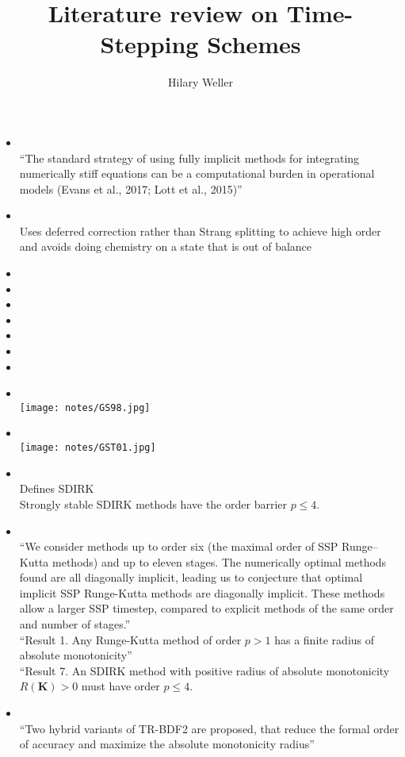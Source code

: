 \documentclass[12pt]{article}
\begin{document}
\title{Literature review on Time-Stepping Schemes}
\author{Hilary Weller}
\maketitle

\begin{itemize}
\item {} \ \\
``The standard strategy of using fully implicit methods for integrating numerically stiff equations can be a computational burden in operational models (Evans et al., 2017; Lott et al., 2015)''
\item {} \ \\
Uses deferred correction rather than Strang splitting to achieve high order and avoids doing chemistry on a state that is out of balance
\item {}
\item {}
\item {}
\item {}
\item {}
\item {}
\item {}
\item {} \ \\ \texttt{[image: notes/GS98.jpg]}
\item {} \ \\ \texttt{[image: notes/GST01.jpg]}
\item {} \ \\ Defines SDIRK \\
Strongly stable SDIRK methods have the order barrier $p\le 4$.
\item {} \ \\
``We consider methods up to order six (the maximal order of SSP Runge–Kutta methods) and up to eleven stages. The
numerically optimal methods found are all diagonally implicit, leading us to conjecture that optimal implicit SSP Runge-Kutta
methods are diagonally implicit. These methods allow a larger SSP timestep, compared to explicit methods of the same order and
number of stages.'' \\
``Result 1. Any Runge-Kutta method of order $p > 1$ has a finite radius of absolute monotonicity'' \\
``Result 7. An SDIRK method with positive radius of absolute monotonicity $R(\mathbf{K}) > 0$ must have order $p \le 4$.

\item {} \ \\ ``Two hybrid variants of TR-BDF2 are proposed, that reduce the formal order of accuracy and maximize the absolute monotonicity radius''
\end{itemize}
\end{document}
